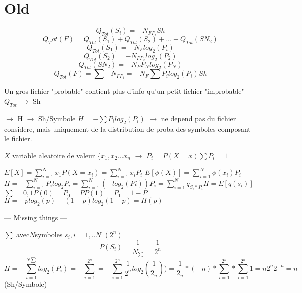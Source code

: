 \documentclass[a4paper,11pt]{article}
\begin{document}
\section{Old}

$$
Q_{Tot}(S_{i}) = - N_{FP_{i}} Sh
$$ $$
Q_Tot(F) = Q_{Tot}(S_{1}) + Q_{Tot}(S_{2}) + ... + Q_{Tot}(S{N_{2}})
$$ $$
Q_{Tot}(S_{1}) = -N_{F}log_{2}(P_{i})
$$ $$
Q_{Tot}(S_{2}) = -N_{FP_{2}}log_{2}(P_{2})
$$ $$
Q_{Tot}(S{N_{2}}) = -N_{F}P_{N}log_{2}(P_{N})
$$ $$
Q_{Tot}(F) =  \sum -N_{FP_{i}}
= -N_{F} \sum P_{i}log_{2}(P_{i}) Sh
$$

Un gros fichier "probable" contient plus d'info qu'un petit fichier "improbable"
$
Q_{Tot} $ $\rightarrow$ Sh

$\rightarrow$ H $\rightarrow$ Sh/Symbole
$
H = - \sum P_{i}log_{2}(P_{i})$ $\rightarrow$ ne depend pas du fichier considere, mais uniquement
de la distribution de proba des symboles composant le fichier.



$X$ variable aleatoire de valeur $ \{ x_{1}, x_{2} ... x_{n} $
$\rightarrow$ $P_{i} = P(X = x) \sum P_{i} = 1$

$
E[X] = \sum_{i=1}^{N} x_{1} P(X = x_{i}) = \sum_{i = 1}^{N} x_{i} P_{i}
$ $
E[\phi (X)] = \sum_{i=1}^{N} \phi (x_{i})P_{i}
$ $
H= - \sum_{i= 1}^{N}P_{i}log_{2}P_{i} = \sum_{i = 1}^{N} (-log_{2}(Pi)) P_{i} = \sum_{i = 1}^{N}q_{S_{i} * P_{i}}
H = E[q(s_{i})]
$ $
\sum = {0,1} P(0) = P_{0} = P
             P(1) = P_{1} = 1 - P
$ $
H = -p log_{2}(p) - (1 - p) log_{2}(1 - p)
  = H(p)
$

---
Missing things
---



$\sum$ avec$ N $symboles $s_{i}, i = 1, .. N$
                                 $   (2^{n})$
$$
P(S_{i}) = \frac{1}{N_{\sum}} = \frac{1}{ 2^{n}}$$
$$
H = - \sum_{i = 1}^{N\sum} log_{2}(P_{i}) = - \sum_{i = 1}^{2^{n}}
  = -\sum_{i = 1}^{2^{n}} \frac{1}{2^{n}} log_{2} (\frac{1}{ 2_{n}}))
  = \frac{1}{ 2_{n}} * (-n) * \sum_{i = 1}^{2^{n}} * \sum_{i = 1}^{2^{n}} 1  
  = n2^{n}2^{-n} = n $$     (Sh/Symbole)
\end{document}
